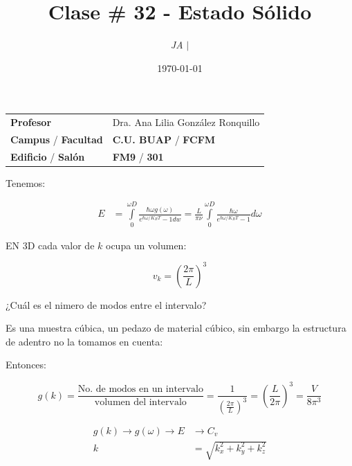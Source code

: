 \documentclass{article}
\title{Clase \# 32 - Estado Sólido}
\author{\emph{JA} $\boldsymbol{\mid}$}
\date{\today}
\begin{document}
\maketitle



\begin{mybox}
\noindent\begin{tabular}{@{}ll}
	{\bfseries{Profesor}} & Dra. Ana Lilia González Ronquillo\\
	\textcolor{prussianblue}{\bfseries{Campus}} / \textcolor{trueblue}{\bfseries{Facultad}}  & \textcolor{prussianblue}{\bfseries{C.U. BUAP}} /  \textcolor{trueblue}{\bfseries{FCFM}} \\
	\textcolor{prussianblue}{\bfseries{Edificio}} /  \textcolor{trueblue}{\bfseries{Salón}}    & 	\textcolor{prussianblue}{\bfseries{FM9}} /  \textcolor{trueblue}{\bfseries{301}}   
\end{tabular} 
\end{mybox} \vspace{1cm}

\tableofcontents

\vspace{2cm}

Tenemos:

\begin{equation}
\begin{split}
 E  &= \int\limits_{0}^{\omega D} \frac{  \hbar \omega g(\omega) }{ e^{\hbar \omega / K_{B}T } -1  dw} = \frac{L}{\pi \nu} \int\limits_{0}^{\omega{D}} \frac{ \hbar \omega }{ e^{\hbar \omega / K_{B}T} -1  } d\omega
\end{split}
\end{equation}


EN 3D cada valor de $k$ ocupa un volumen:


\[ v_{k} = \left( \frac{2\pi}{L} \right)^{3} \]


¿Cuál es el nimero de modos entre el intervalo? 

Es una muestra cúbica, un pedazo de material cúbico, sin embargo la estructura de adentro no la tomamos en cuenta:


Entonces:


\[  g(k) = \frac{ \text{No. de modos en un intervalo}  }{  \text{ volumen del intervalo } } = \frac{ 1 }{ \left(  \frac{2\pi}{L} \right)^{3} } = \left( \frac{L}{2\pi} \right)^{3} = \frac{V}{8\pi^{3}}\]

\begin{equation}
\begin{split}
 g(k) \to g(\omega) \to E &\to C_{v}\\
  k &= \sqrt{ k_{x}^{2} + k_{y}^{2} + k_{z}^{2} }
\end{split}
\end{equation}
\end{document}
